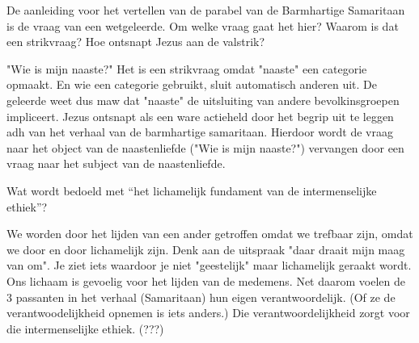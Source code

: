 \documentclass[main.tex]{subfiles}
\begin{document}
\begin{examenvraag}
    \begin{vraag}
        De aanleiding voor het vertellen van de parabel van de Barmhartige Samaritaan is de vraag van een wetgeleerde. Om welke vraag gaat het hier? Waarom is dat een strikvraag? Hoe ontsnapt Jezus aan de valstrik?
    \end{vraag}

    \begin{antwoord}
		"Wie is mijn naaste?"
		Het is een strikvraag omdat "naaste" een categorie opmaakt. 
		En wie een categorie gebruikt, sluit automatisch anderen uit.
		De geleerde weet dus maw dat "naaste" de uitsluiting van andere bevolkinsgroepen impliceert.
		Jezus ontsnapt als een ware actieheld door het begrip uit te leggen adh van het verhaal van de barmhartige samaritaan.
		Hierdoor wordt de vraag naar het object van de naastenliefde ("Wie is mijn naaste?")  vervangen door een vraag naar het subject van de naastenliefde.
		
		    
    
    \end{antwoord}
\end{examenvraag}


\begin{examenvraag}
    \begin{vraag}
        Wat wordt bedoeld met “het lichamelijk fundament van de intermenselijke ethiek”?
    \end{vraag}

    \begin{antwoord}
       We worden door het lijden van een ander getroffen omdat we trefbaar zijn, omdat we door en door lichamelijk zijn.
       Denk aan de uitspraak "daar draait mijn maag van om". 
       Je ziet iets waardoor je niet "geestelijk" maar lichamelijk geraakt wordt.
       Ons lichaam is gevoelig voor het lijden van de medemens.
       Net daarom voelen de 3 passanten in het verhaal (Samaritaan) hun eigen verantwoordelijk.
       (Of ze de verantwoodelijkheid opnemen is iets anders.)
       Die verantwoordelijkheid zorgt voor die intermenselijke ethiek. (???)

    \end{antwoord}
\end{examenvraag}
\end{document}
